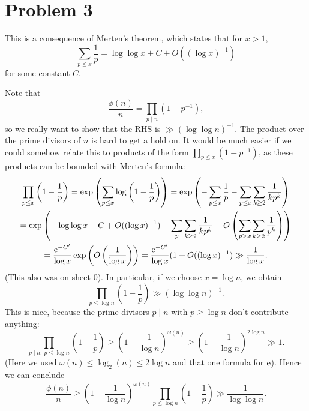 \documentclass[a4paper,11pt]{article}
\begin{document}
\section*{Problem 3}
This is a consequence of Merten's theorem, which states that for 
$x > 1$, 
\[
    \sum_{p \leq x} \frac 1p = \log \log x + C + O((\log x)^{-1})
\]
for some constant $C$. 

Note that 
\[
    \frac{\phi(n)}n = \prod_{p \mid n} (1 - p^{-1}),
\]
so we really want to show that the RHS is $\gg (\log \log n)^{-1}$. 
The product over the prime divisors of $n$ is hard to get a hold on. 
It would be much easier if we could somehow relate this to products of 
the form $\prod_{p \leq x} (1-p^{-1})$, as these products can be bounded
with Merten's formula:
\begin{multline*}
    \prod_{p \leq x} \left(1 - \frac 1p \right) 
    = \exp \left( \sum_{p \leq x} \log \left( 1- \frac 1p \right) \right) = \exp \left( - \sum_{p \leq x} \frac 1p - \sum_{p \leq x} \sum_{k \geq 2} \frac1{kp^k} \right) \\ 
    = \exp\left( - \log \log x -C + O((\log x)^{-1}) - \sum_p \sum_{k \geq 2} \frac1{kp^k} + O\left( \sum_{p > x} \sum_{k \geq 2} \frac1 {p^k} \right) \right) \\ 
    = \frac{ \mathrm e^{-C'}}{\log x} \exp \left( O \left( \frac 1{\log x} \right) \right) 
    = \frac{\mathrm e^{-C'}}{\log x}(1 + O((\log x)^{-1}) 
    \gg \frac 1{\log x}.
\end{multline*}
(This also was on sheet 0). 
In particular, if we choose $x = \log n$, we obtain
\[
    \prod_{p \leq \log n}\left(1 - \frac 1p\right) \gg (\log \log n)^{-1}.
\]
This is nice, because the prime divisors $p \mid n$ with $p \geq \log n$ 
don't contribute anything: 
\[
    \prod_{p \mid n, \ p \leq \log n} \left(1 - \frac 1p\right)
    \geq \left( 1 - \frac 1 {\log n} \right)^{\omega(n)}
    \geq \left(1 - \frac 1 {\log n} \right)^{2 \log n} \gg 1.
\]
(Here we used $\omega(n) \leq \log_2(n) \leq 2 \log n$ and that one formula for $\mathrm e$). Hence we can conclude
\[
    \frac{\phi(n)}n \geq
    \left( 1 - \frac 1{\log n} \right)^{\omega(n)} \prod_{p \leq \log n}
    \left(1 - \frac 1p\right) \gg \frac 1{\log \log n}.
\]
\end{document}
